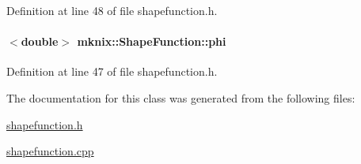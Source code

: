 Definition at line 48 of file shapefunction.\+h.

\hypertarget{classmknix_1_1_shape_function_ac1eaf8c2e5d8d6abf4726eb416de13d9}{}
\paragraph[{phi}]{$<$double$>$ mknix\+::\+Shape\+Function\+::phi\hspace{0.3cm}{\ttfamily [protected]}}\label{classmknix_1_1_shape_function_ac1eaf8c2e5d8d6abf4726eb416de13d9}


Definition at line 47 of file shapefunction.\+h.



The documentation for this class was generated from the following files\+:\begin{DoxyCompactItemize}
\item 
\hyperlink{shapefunction_8h}{shapefunction.\+h}\item 
\hyperlink{shapefunction_8cpp}{shapefunction.\+cpp}\end{DoxyCompactItemize}
